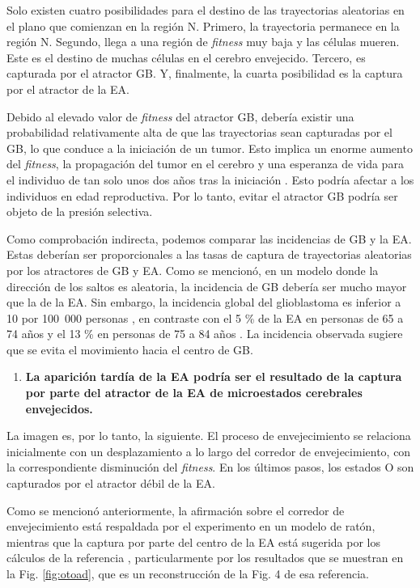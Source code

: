 Solo existen cuatro posibilidades para el destino de las trayectorias aleatorias en el plano que comienzan en la región N. Primero, la trayectoria permanece en la región N. Segundo, llega a una región de \textit{fitness} muy baja y las células mueren. Este es el destino de muchas células en el cerebro envejecido. Tercero, es capturada por el atractor GB. Y, finalmente, la cuarta posibilidad es la captura por el atractor de la EA.

Debido al elevado valor de \textit{fitness} del atractor GB, debería existir una probabilidad relativamente alta de que las trayectorias sean capturadas por el GB, lo que conduce a la iniciación de un tumor. Esto implica un enorme aumento del \textit{fitness}, la propagación del tumor en el cerebro y una esperanza de vida para el individuo de tan solo unos dos años tras la iniciación \cite{Poon_2020}. Esto podría afectar a los individuos en edad reproductiva. Por lo tanto, evitar el atractor GB podría ser objeto de la presión selectiva.

Como comprobación indirecta, podemos comparar las incidencias de GB y la EA. Estas deberían ser proporcionales a las tasas de captura de trayectorias aleatorias por los atractores de GB y EA. Como se mencionó, en un modelo donde la dirección de los saltos es aleatoria, la incidencia de GB debería ser mucho mayor que la de la EA. Sin embargo, la incidencia global del glioblastoma es inferior a 10 por 100 000 personas \cite{Ohgaki2005}, en contraste con el 5 \% de la EA en personas de 65 a 74 años y el 13 \% en personas de 75 a 84 años \cite{alz2023}. La incidencia observada sugiere que se evita el movimiento hacia el centro de GB.

\begin{enumerate}
	\item[5.] \textbf{La aparición tardía de la EA podría ser el resultado de la captura por parte del atractor de la EA de microestados cerebrales envejecidos.}
\end{enumerate}

La imagen es, por lo tanto, la siguiente. El proceso de envejecimiento se relaciona inicialmente con un desplazamiento a lo largo del corredor de envejecimiento, con la correspondiente disminución del \textit{fitness}. En los últimos pasos, los estados O son capturados por el atractor débil de la EA.

Como se mencionó anteriormente, la afirmación sobre el corredor de envejecimiento está respaldada por el experimento en un modelo de ratón, mientras que la captura por parte del centro de la EA está sugerida por los cálculos de la referencia \cite{Gonzalez_2021}, particularmente por los resultados que se muestran en la Fig. \ref{fig:otoad}, que es un reconstrucción de la Fig. 4 de esa referencia.

